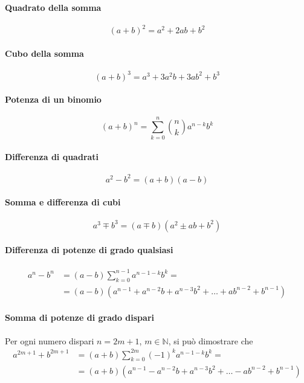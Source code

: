 \paragraph{Quadrato della somma}
\begin{equation}
    (a+b)^2 = a^2 + 2 ab + b^2
\end{equation}
\paragraph{Cubo della somma}
\begin{equation}
    (a+b)^3 = a^3 + 3 a^2 b + 3 a b^2 + b^3
\end{equation}
\paragraph{Potenza di un binomio}
\begin{equation}
    (a+b)^n = \sum_{k=0}^{n} \binom{n}{k} a^{n-k} b^{k}
\end{equation}
\paragraph{Differenza di quadrati}
\begin{equation}
    a^2 - b^2 = (a+b)(a-b)
\end{equation}
\paragraph{Somma e differenza di cubi}
\begin{equation}
    a^3 \mp b^3 = (a \mp b)(a^2 \pm ab + b^2)
\end{equation}
\paragraph{Differenza di potenze di grado qualsiasi}
\begin{equation}
\begin{aligned}
    a^n - b^n & =
        (a-b) \sum_{k=0}^{n-1} a^{n-1-k} b^k = \\
    & = (a-b)(a^{n-1} + a^{n-2}b + a^{n-3}b^2 + \dots + a b^{n-2} + b^{n-1})
\end{aligned}
\end{equation}
\paragraph{Somma di potenze di grado dispari}
Per ogni numero dispari $n = 2m + 1$, $m \in \mathbb{N}$, si può dimostrare che
\begin{equation}
\begin{aligned}
    a^{2m+1} + b^{2m+1} & =
        (a + b) \sum_{k=0}^{2m} (-1)^k a^{n-1-k} b^k = \\
    & = (a + b)(a^{n-1} - a^{n-2}b + a^{n-3}b^2 + \dots - a b^{n-2} + b^{n-1})
\end{aligned}
\end{equation}

